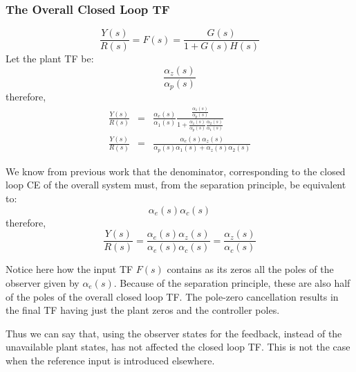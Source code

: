 

\subsubsection*{The Overall Closed Loop TF} %
\label{ssub:the_overall_closed_loop_tf}
\[
\frac{Y(s)}{R(s)}=F(s)=\frac{G(s)}{1+G(s)H(s)}
\]
Let the plant TF be:
\[
\frac{\alpha_z(s)}{\alpha_p(s)}
\]
therefore,
\begin{eqnarray*}
	\frac{Y(s)}{R(s)} &=& \frac{\alpha_e(s)}{\alpha_1(s)}\frac{\frac{\alpha_z(s)}{\alpha_p(s)}}{1+\frac{\alpha_z(s)}{\alpha_p(s)}\frac{\alpha_2(s)}{\alpha_1(s)}} \\
	\frac{Y(s)}{R(s)} &=& \frac{\alpha_e(s)\alpha_z(s)}{\alpha_p(s)\alpha_1(s)+\alpha_z(s)\alpha_2(s)}
\end{eqnarray*}

We know from previous work that the denominator, corresponding to the closed loop CE of the overall system must, from the separation principle, be equivalent to:
\[
\alpha_e(s)\alpha_c(s)
\]
therefore,
\[
\frac{{Y(s)}}{{R(s)}} = \frac{{\alpha _e (s)\alpha _z (s)}}{{\alpha _e (s)\alpha _c (s)}} = \frac{{\alpha _z (s)}}{{\alpha _c (s)}}
\]

Notice here how the input TF $F(s)$ contains as its zeros all the poles of the observer given by $\alpha_e(s)$.
Because of the separation principle, these are also half of the poles of the overall closed loop TF.
The pole-zero cancellation results in the final TF having just the plant zeros and the controller poles.

Thus we can say that, using the observer states for the feedback, instead of the unavailable plant states, has not affected the closed loop TF.
This is not the case when the reference input is introduced elsewhere.

